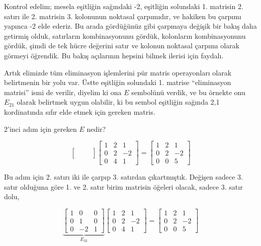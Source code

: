 \documentclass[12pt,fleqn]{article}\usepackage{../../common}
\begin{document}
Kontrol edelim; mesela eşitliğin sağındaki -2, eşitliğin solundaki
1. matrisin 2. satırı ile 2. matrisin 3. kolonunun noktasal çarpımıdır, ve
hakiken bu çarpımı yapınca -2 elde ederiz. Bu arada gördüğünüz gibi
çarpmaya değişik bir bakış daha getirmiş olduk, satırların kombinasyonunu
gördük, kolonların kombinasyonunu gördük, şimdi de tek hücre değerini 
satır ve kolonun noktasal çarpımı olarak görmeyi öğrendik. Bu bakış
açılarının hepsini bilmek ilerisi için faydalı.

Artık elimizde tüm eliminasyon işlemlerini pür matris operayonları olarak
belirtmenin bir yolu var. Üstte eşitliğin solundaki 1. matrise
``eliminasyon matrisi'' ismi de verilir, diyelim ki ona $E$ sembolünü
verdik, ve bu örnekte onu $E_{21}$ olarak belirtmek uygun olabilir, ki bu
sembol eşitliğin sağında 2,1 kordinatında sıfır elde etmek için gereken
matris. 

2'inci adım için gereken $E$ nedir? 

$$ 
\left[\begin{array}{rrr}
 &  &  \\
 &  &  \\
 &  & 
\end{array}\right]
\left[\begin{array}{rrr}
  1 & 2 & 1 \\
  0 & 2 & -2 \\
  0 & 4 & 1
\end{array}\right] 
=
\left[\begin{array}{rrr}
1 & 2 & 1 \\
0 & 2 & -2 \\
0 & 0 & 5
\end{array}\right]
 $$

Bu adım için 2. satırı iki ile çarpıp 3. satırdan çıkartmıştık. Değişen
sadece 3. satır olduğuna göre 1. ve 2. satır birim matrisin öğeleri olacak,
sadece 3. satır dolu,

$$ 
\underbrace{
\left[\begin{array}{rrr}
1 & 0 & 0 \\
0 & 1 & 0 \\
0 & -2 & 1
\end{array}\right]
}_{E_{32} }
\left[\begin{array}{rrr}
  1 & 2 & 1 \\
  0 & 2 & -2 \\
  0 & 4 & 1
\end{array}\right] 
=
\left[\begin{array}{rrr}
1 & 2 & 1 \\
0 & 2 & -2 \\
0 & 0 & 5
\end{array}\right]
 $$
\end{document}

